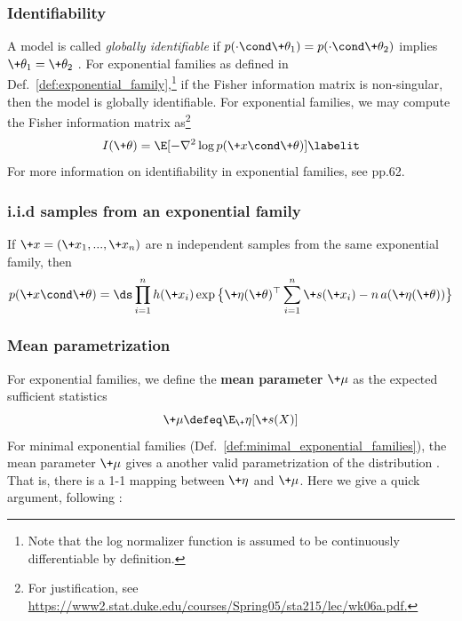 \documentclass{article} %
\newcommand{\obs}{\+x}
\newcommand{\logNormalizerFunction}{a}
\newcommand{\sufficientStatsFunction}{\+s}
\newcommand{\carrierDensity}{h}
\newcommand{\meanParam}{\+\mu}
\newcommand{\param}{\+\theta}
\newcommand{\naturalParam}{\+\eta}
\begin{document}
\subsubsection{Identifiability}

A model is called \textit{globally identifiable} if $p(\cdot \cond \param_1) = p(\cdot \cond \param_2)$ implies $\param_1=\param_2$ \cite{cole2020parameter}. For exponential families as defined in Def.~\ref{def:exponential_family},\footnote{Note that the log normalizer function is assumed to be continuously differentiable by definition.} if the Fisher information matrix is non-singular, then the model is globally identifiable.  For exponential families, we may compute the Fisher information matrix as\footnote{For justification, see \url{https://www2.stat.duke.edu/courses/Spring05/sta215/lec/wk06a.pdf.}}
\begin{align*}
I(\param) = \E [ -\nabla^2 \log p(\obs \cond \param)]
\labelit \label{eqn:fisher_information_matrix_for_exponential_families}	
\end{align*}
For more information on identifiability in exponential families, see \cite{cole2020parameter} pp.62. 

\subsubsection{i.i.d samples from an exponential family} \label{sec:iid_samples_from_an_exponential_family}
If $\obs=(\obs_1, ..., \obs_n)$ are n independent samples from the same exponential family, then 
\begin{align}
\label{eqn:exponential_family_iid}
 p(\obs \cond \param) = \ds\prod_{i=1}^n \carrierDensity(\obs_i) \exp \big\{ \naturalParam(\param)^\top \sum_{i=1}^n \sufficientStatsFunction(\obs_i) - n \,\logNormalizerFunction(\naturalParam(\param))\big\} 
 \end{align}


\subsubsection{Mean parametrization} \label{sec:mean_parametrization}

For exponential families, we define the \textbf{mean parameter} $\meanParam$ as the expected sufficient statistics 
%
\[ \meanParam \defeq \E_\naturalParam[\sufficientStatsFunction(X)]
\]
%
For minimal exponential families (Def.~\ref{def:minimal_exponential_families}), the mean parameter $\meanParam$ gives a another valid parametrization of the distribution \cite[Sec.~8.4]{jordan2010exponential}. That is, there is a 1-1 mapping between $\naturalParam$ and $\meanParam$.  Here we give a quick argument, following \citet{blei2011exponential}: 
\end{document}
